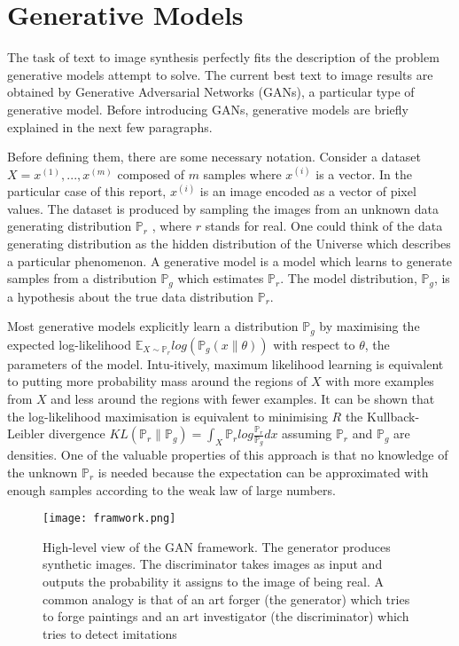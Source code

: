 \documentclass[10pt,twocolumn,letterpaper]{article}
\begin{document}
  \section{Generative Models}
  The task of text to image synthesis perfectly fits the description of the problem generative models attempt to solve. The current best text to image results are obtained by Generative Adversarial Networks (GANs), a particular type of generative model. Before introducing GANs, generative models are briefly explained in the next few paragraphs.
  \par Before defining them, there are some necessary notation. Consider a dataset $X = {x^{(1)} , . . . , x^{(m)} }$ composed of $m$ samples where $x^{(i)}$ is a vector. In the particular case
  of this report, $x^{(i)}$ is an image encoded as a vector of pixel values. The dataset is produced by sampling the images from an unknown data generating distribution $\mathbb{P}_r$ , where $r$ stands for real. One could think of the data generating distribution as the hidden distribution of the Universe which describes a particular phenomenon. A generative model is a model which learns to generate samples from a distribution $\mathbb{P}_g$ which estimates $\mathbb{P}_r$. The model distribution, $\mathbb{P}_g$, is a hypothesis about the true data distribution $\mathbb{P}_r$. 
  \par Most generative models explicitly learn a distribution $\mathbb{P}_g$ by maximising the expected log-likelihood $\mathbb{E }_{X∼\mathbb{P}_r}log(\mathbb{P}_g(x\parallel\theta))$ with respect to $\theta$, the parameters of the model. Intu-itively, maximum likelihood learning is equivalent to putting more probability mass around the regions of $X$ with more examples from $X$ and less around the regions with fewer examples. It can be shown that the log-likelihood maximisation is equivalent to minimising
  $R$ the Kullback-Leibler divergence $KL(\mathbb{P}_r\parallel{\mathbb{P}_g})=\int_{X}\mathbb{P}_rlog\frac{\mathbb{P}_r}{\mathbb{P}_g}dx$ assuming $\mathbb{P}_r$ and $\mathbb{P}_g$ are densities. One of the valuable properties of this approach is that no knowledge of the unknown $\mathbb{P}_r$ is needed because the expectation can be approximated with enough samples according to the weak law of large numbers.
  \begin{figure}[!htb]
  	\centering
  	\texttt{[image: framwork.png]}\\
  	\caption{High-level view of the GAN framework. The generator produces synthetic images. The
  		discriminator takes images as input and outputs the probability it assigns to the image of being
  		real. A common analogy is that of an art forger (the generator) which tries to forge paintings and
  		an art investigator (the discriminator) which tries to detect imitations}\label{Figure2} 
  	\end{figure}
\end{document}
